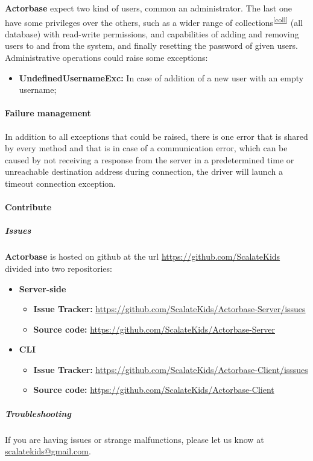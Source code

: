 \documentclass{scalatekids-article}
\begin{document}
\textbf{Actorbase} expect two kind of users, common an administrator. The last one have
some privileges over the others, such as a wider range of collections\textsuperscript{\ref{coll}} (all
database) with read-write permissions, and capabilities of adding and removing
users to and from the system, and finally resetting the password of given users.
Administrative operations could raise some exceptions:
\begin{itemize}
\item \textbf{UndefinedUsernameExc:} In case of addition of a new user with an empty username;
\end{itemize}

\paragraph{Failure management}

In addition to all exceptions that could be raised, there is one error that is
shared by every method and that is in case of a communication error, which can
be caused by not receiving a response from the server in a predetermined time or
unreachable destination address during connection, the driver will launch a
timeout connection exception.

\paragraph{Contribute}

\subparagraph{Issues}

\textbf{Actorbase} is hosted on github at the url
\url{https://github.com/ScalateKids} divided into two repositories:

\begin{itemize}
\item\textbf{Server-side}
  \begin{itemize}
  \item \textbf{Issue Tracker:} \url{https://github.com/ScalateKids/Actorbase-Server/issues}
  \item \textbf{Source code:} \url{https://github.com/ScalateKids/Actorbase-Server}
  \end{itemize}
\item\textbf{CLI}
  \begin{itemize}
  \item \textbf{Issue Tracker:} \url{https://github.com/ScalateKids/Actorbase-Client/isssues}
  \item \textbf{Source code:} \url{https://github.com/ScalateKids/Actorbase-Client}
  \end{itemize}
\end{itemize}

\subparagraph{Troubleshooting}

If you are having issues or strange malfunctions, please let us know at
\href{mailto:scalatekids@gmail.com}{scalatekids@gmail.com}.
\end{document}

